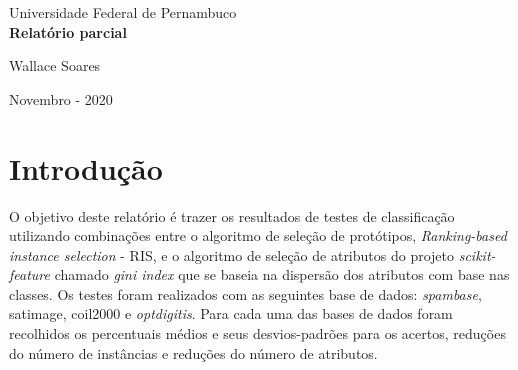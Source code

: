 \documentclass[a4paper, 12pt]{article}
\begin{document}
\sloppy
\begin{titlepage}
	\begin{center}


		\Huge{Universidade Federal de Pernambuco}\\
		\vspace{15pt}
        \vspace{95pt}
        \textbf{\LARGE{Relatório parcial}}\\
		\vspace{3,5cm}
	\end{center}

	\begin{flushleft}
		\begin{tabbing}
			Wallace Soares\\
	\end{tabbing}
 \end{flushleft}
	\vspace{1cm}

	\begin{center}
		\vspace{\fill}
			 Novembro -  2020\\

			\end{center}
\end{titlepage}

\newpage
\tableofcontents
\thispagestyle{empty}

\newpage
{}
\section{Introdução}
O objetivo deste relatório é trazer os resultados de testes de classificação utilizando combinações entre o algoritmo de seleção de protótipos, \textit{Ranking-based instance selection} \cite{ris} - RIS, e o algoritmo de seleção de atributos do projeto \textit{scikit-feature}\cite{li2018feature}  chamado \textit{gini index} que se baseia na dispersão dos atributos com base nas classes. Os testes foram realizados com as seguintes base de dados: \textit{spambase}\cite{spambase}, satimage\cite{satimage}, coil2000\cite{coil2000} e \textit{optdigitis}\cite{optdigits}. Para cada uma das bases de dados foram recolhidos os percentuais médios e seus desvios-padrões para os acertos, reduções do número de instâncias e reduções do número de atributos.
\newpage
\end{document}
